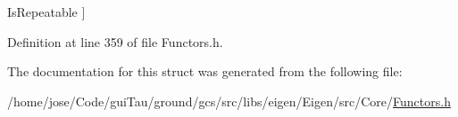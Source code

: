 \begin{Desc}
\begin{description}
{\hypertarget{structei__functor__traits_3_01ei__scalar__identity__op_3_01_scalar_01_4_01_4_a0ddb2383fd3752916935fc916c7a1996aee3a9617071f1956a2646a6b38955ad1}{Is\-Repeatable}\label{structei__functor__traits_3_01ei__scalar__identity__op_3_01_scalar_01_4_01_4_a0ddb2383fd3752916935fc916c7a1996aee3a9617071f1956a2646a6b38955ad1}
}]\end{description}
\end{Desc}


Definition at line 359 of file Functors.\-h.



The documentation for this struct was generated from the following file\-:\begin{DoxyCompactItemize}
\item 
/home/jose/\-Code/gui\-Tau/ground/gcs/src/libs/eigen/\-Eigen/src/\-Core/\hyperlink{_core_2_functors_8h}{Functors.\-h}\end{DoxyCompactItemize}
